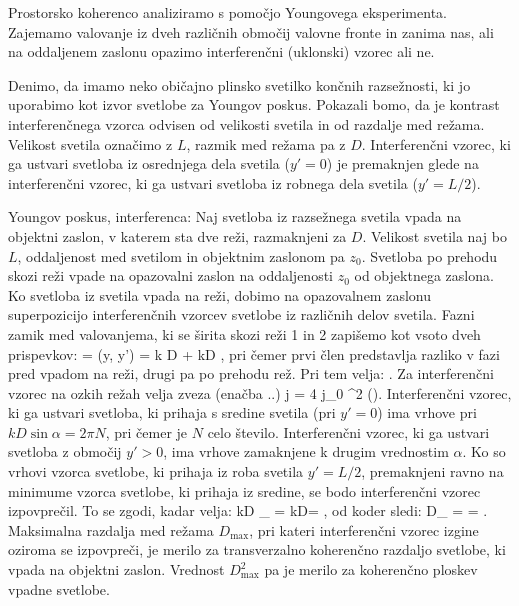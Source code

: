 Prostorsko koherenco analiziramo s pomočjo Youngovega eksperimenta. Zajemamo valovanje
iz dveh različnih območij valovne fronte in zanima nas, ali na oddaljenem zaslonu
opazimo interferenčni (uklonski) vzorec ali ne.

Denimo, da imamo neko običajno plinsko svetilko končnih razsežnosti, ki jo uporabimo kot
izvor svetlobe za Youngov poskus. Pokazali bomo, da je kontrast interferenčnega vzorca odvisen
od velikosti svetila in od razdalje med režama. Velikost svetila označimo z $L$, razmik med
režama pa z $D$. Interferenčni vzorec, ki ga ustvari svetloba iz osrednjega dela svetila ($y'=0$)
je premaknjen glede na interferenčni vzorec, ki ga ustvari svetloba iz robnega dela svetila 
($y'=L/2$).

Youngov poskus, interferenca: Naj svetloba iz razsežnega svetila vpada na objektni zaslon, 
v katerem sta dve reži, razmaknjeni za $D$. Velikost svetila naj bo $L$, oddaljenost med 
svetilom in objektnim zaslonom pa $z_0$. Svetloba po prehodu skozi reži vpade na opazovalni
zaslon na oddaljenosti $z_0$ od objektnega zaslona. Ko svetloba iz svetila vpada na reži, dobimo
na opazovalnem zaslonu superpozicijo interferenčnih vzorcev svetlobe iz različnih delov svetila. 
Fazni zamik med valovanjema, ki se širita skozi reži 1 in 2 zapišemo kot vsoto dveh prispevkov: 
\beq
\Delta \phi = \Delta \phi (y, y') = k D \sin \beta + kD \sin \alpha,
\eeq
pri čemer prvi člen predstavlja razliko v fazi pred vpadom na reži, drugi pa po 
prehodu rež. Pri tem velja:
\beq
\sin \alpha \approx \alpha \approx {} \qquad {} \qquad
\sin \beta \approx \beta \approx {}.
\eeq
Za interferenčni vzorec na ozkih režah velja zveza (enačba ..)
\beq
j = 4 j_0 \cos^2 \left(\right).
\eeq
Interferenčni vzorec, ki ga ustvari svetloba, ki prihaja s sredine svetila (pri $y'=0$) ima
vrhove pri $kD\sin \alpha = 2\pi N$, pri čemer je $N$ celo število. Interferenčni vzorec, ki 
ga ustvari svetloba z območij $y'>0$, ima vrhove zamaknjene k drugim vrednostim $\alpha$. Ko so 
vrhovi vzorca svetlobe, ki prihaja iz roba svetila $y'=L/2$, premaknjeni ravno na minimume
vzorca svetlobe, ki prihaja iz sredine, se bodo interferenčni vzorec izpovprečil. To se zgodi, 
kadar velja:
\beq
kD \sin\beta_ = kD= \pi,
\eeq
od koder sledi:
\beq
D_ =  = .
\eeq
Maksimalna razdalja med režama $D_\mathrm{max}$, pri kateri interferenčni vzorec izgine oziroma
se izpovpreči, je merilo za transverzalno koherenčno razdaljo svetlobe, ki vpada na objektni zaslon.
Vrednost $D_\mathrm{max}^2$ pa je merilo za koherenčno ploskev vpadne svetlobe.

